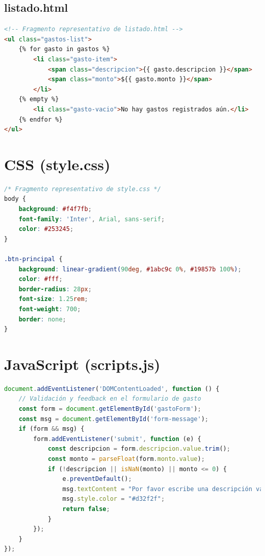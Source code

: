 \documentclass[12pt,a4paper]{article}
\begin{document}
\subsection{listado.html}
\begin{lstlisting}[language=HTML]
<!-- Fragmento representativo de listado.html -->
<ul class="gastos-list">
    {% for gasto in gastos %}
        <li class="gasto-item">
            <span class="descripcion">{{ gasto.descripcion }}</span>
            <span class="monto">${{ gasto.monto }}</span>
        </li>
    {% empty %}
        <li class="gasto-vacio">No hay gastos registrados aún.</li>
    {% endfor %}
</ul>
\end{lstlisting}

\section{CSS (style.css)}

\begin{lstlisting}[language=CSS]
/* Fragmento representativo de style.css */
body {
    background: #f4f7fb;
    font-family: 'Inter', Arial, sans-serif;
    color: #253245;
}

.btn-principal {
    background: linear-gradient(90deg, #1abc9c 0%, #19857b 100%);
    color: #fff;
    border-radius: 28px;
    font-size: 1.25rem;
    font-weight: 700;
    border: none;
}
\end{lstlisting}

\section{JavaScript (scripts.js)}

\begin{lstlisting}[language=JavaScript]
document.addEventListener('DOMContentLoaded', function () {
    // Validación y feedback en el formulario de gasto
    const form = document.getElementById('gastoForm');
    const msg = document.getElementById('form-message');
    if (form && msg) {
        form.addEventListener('submit', function (e) {
            const descripcion = form.descripcion.value.trim();
            const monto = parseFloat(form.monto.value);
            if (!descripcion || isNaN(monto) || monto <= 0) {
                e.preventDefault();
                msg.textContent = "Por favor escribe una descripción válida y un monto mayor a 0.";
                msg.style.color = "#d32f2f";
                return false;
            }
        });
    }
});
\end{lstlisting}
\end{document}
